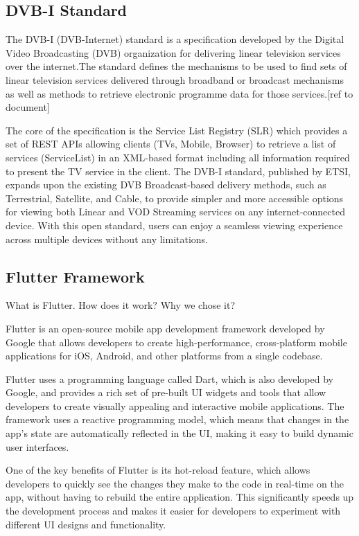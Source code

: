 \documentclass[conference]{IEEEtran}
\begin{document}
\subsection{DVB-I Standard}



The DVB-I (DVB-Internet) standard is a specification developed by the Digital Video Broadcasting (DVB) organization for delivering linear television services over the internet.The standard defines the mechanisms to be used to find sets of linear television services delivered through broadband or broadcast mechanisms as well as methods to retrieve electronic programme data for those services.[ref to document]

The core of the specification is the Service List Registry (SLR) which provides a set of REST APIs allowing clients (TVs, Mobile, Browser) to retrieve a list of services (ServiceList) in an XML-based format including all information required to present the TV service in the client. The DVB-I standard, published by ETSI, expands upon the existing DVB Broadcast-based delivery methods, such as Terrestrial, Satellite, and Cable, to provide simpler and more accessible options for viewing both Linear and VOD Streaming services on any internet-connected device. With this open standard, users can enjoy a seamless viewing experience across multiple devices without any limitations.





\subsection{Flutter Framework}\label{AA}

What is Flutter. How does it work? Why we chose it?

Flutter is an open-source mobile app development framework developed by Google that allows developers to create high-performance, cross-platform mobile applications for iOS, Android, and other platforms from a single codebase.

Flutter uses a programming language called Dart, which is also developed by Google, and provides a rich set of pre-built UI widgets and tools that allow developers to create visually appealing and interactive mobile applications. The framework uses a reactive programming model, which means that changes in the app's state are automatically reflected in the UI, making it easy to build dynamic user interfaces.

One of the key benefits of Flutter is its hot-reload feature, which allows developers to quickly see the changes they make to the code in real-time on the app, without having to rebuild the entire application. This significantly speeds up the development process and makes it easier for developers to experiment with different UI designs and functionality.
\end{document}
